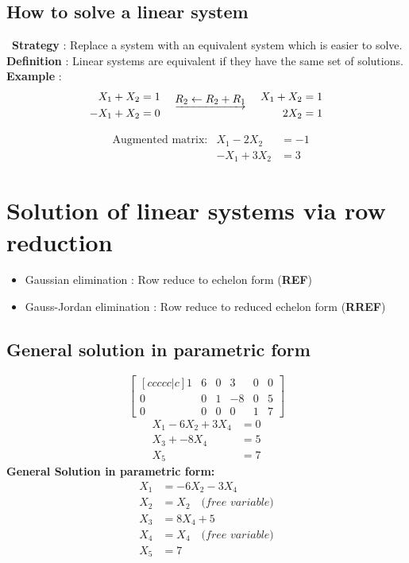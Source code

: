 \documentclass{article}
\begin{document}
\subsection{How to solve a linear system}
{\
\noindent \textbf{Strategy} : Replace a system with an equivalent system which is easier to solve. 
\\
\noindent \textbf{Definition} : Linear systems are equivalent if they have the same set of solutions.
\\
\noindent \textbf{Example} :
\begin{align*} 
    X_1 + X_2 &= 1   &                                                                      & & X_1 + X_2 &= 1  \\
    -X_1 + X_2 &= 0  &\raisebox{3ex}[0pt][0pt]{ $\underrightarrow{R_2 \leftarrow R_2 + R_1}$ }& &      2X_2 &= 1
\end{align*}


\begin{align*}
    &\text{Augmented matrix:}  & X_1 - 2X_2 &= -1 \\
    &                           & -X_1 + 3X_2 &= 3
\end{align*}

\section{Solution of linear systems via row reduction}
{
\begin{itemize}
    \item Gaussian elimination : Row reduce to echelon form (\textbf{REF})
    \item Gauss-Jordan elimination : Row reduce to reduced echelon form (\textbf{RREF})
\end{itemize}
}

\subsection{General solution in parametric form}
{
\[
\begin{bmatrix}[ccccc|c]
    1 & 6 & 0 & 3 & 0 & 0 \\
    0 & 0 & 1 & -8& 0 & 5 \\
    0 & 0 & 0 & 0 & 1 & 7
\end{bmatrix}
\]
\begin{align*}
     X_1 - 6X_2 + 3X_4 &= 0 \\
     X_3 + -8X_4 &= 5 \\
     X_5 &=7
\end{align*}
\textbf{General Solution in parametric form:}
\begin{align*}
     X_1 &= -6X_2 -3X_4 \\
     X_2 &= X_2 \quad \textit{(free variable)}\\
     X_3 &= 8X_4 + 5 \\
     X_4 &= X_4 \quad \textit{(free variable)}\\
     X_5 &= 7
\end{align*}
}
}
\end{document}
